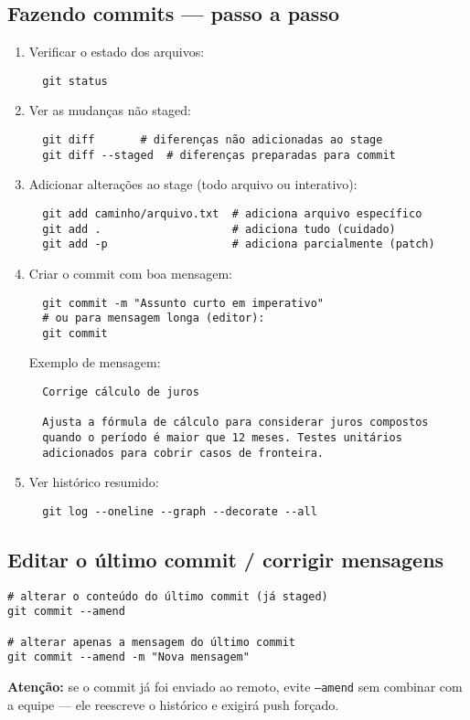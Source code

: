 \subsection{Fazendo commits — passo a passo}
\begin{enumerate}
  \item Verificar o estado dos arquivos:
  \begin{verbatim}
  git status
  \end{verbatim}
  \item Ver as mudanças não staged:
  \begin{verbatim}
  git diff       # diferenças não adicionadas ao stage
  git diff --staged  # diferenças preparadas para commit
  \end{verbatim}
  \item Adicionar alterações ao stage (todo arquivo ou interativo):
  \begin{verbatim}
  git add caminho/arquivo.txt  # adiciona arquivo específico
  git add .                    # adiciona tudo (cuidado)
  git add -p                   # adiciona parcialmente (patch)
  \end{verbatim}
  \item Criar o commit com boa mensagem:
  \begin{verbatim}
  git commit -m "Assunto curto em imperativo"
  # ou para mensagem longa (editor):
  git commit
  \end{verbatim}
  Exemplo de mensagem:
  \begin{verbatim}
  Corrige cálculo de juros

  Ajusta a fórmula de cálculo para considerar juros compostos
  quando o período é maior que 12 meses. Testes unitários
  adicionados para cobrir casos de fronteira.
  \end{verbatim}
  \item Ver histórico resumido:
  \begin{verbatim}
  git log --oneline --graph --decorate --all
  \end{verbatim}
\end{enumerate}

\subsection{Editar o último commit / corrigir mensagens}
\begin{verbatim}
# alterar o conteúdo do último commit (já staged)
git commit --amend

# alterar apenas a mensagem do último commit
git commit --amend -m "Nova mensagem"
\end{verbatim}
\textbf{Atenção:} se o commit já foi enviado ao remoto, evite \texttt{--amend} sem combinar com a equipe — ele reescreve o histórico e exigirá push forçado.

